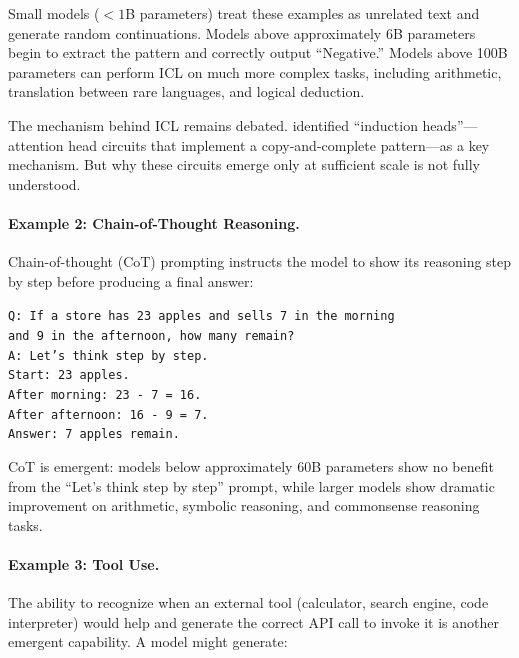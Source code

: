 Small models ($< 1$B parameters) treat these examples as unrelated text and generate random continuations. Models above approximately 6B parameters begin to extract the pattern and correctly output ``Negative.'' Models above 100B parameters can perform ICL on much more complex tasks, including arithmetic, translation between rare languages, and logical deduction.

The mechanism behind ICL remains debated. \citet{olsson2022context} identified ``induction heads''---attention head circuits that implement a copy-and-complete pattern---as a key mechanism. But why these circuits emerge only at sufficient scale is not fully understood.

\paragraph{Example 2: Chain-of-Thought Reasoning.}
Chain-of-thought (CoT) prompting \citep{wei2022chain} instructs the model to show its reasoning step by step before producing a final answer:

\begin{center}
\begin{minipage}{0.85\textwidth}
\texttt{Q: If a store has 23 apples and sells 7 in the morning}\\
\texttt{and 9 in the afternoon, how many remain?}\\
\texttt{A: Let's think step by step.}\\
\texttt{Start: 23 apples.}\\
\texttt{After morning: 23 - 7 = 16.}\\
\texttt{After afternoon: 16 - 9 = 7.}\\
\texttt{Answer: 7 apples remain.}
\end{minipage}
\end{center}

CoT is emergent: models below approximately 60B parameters show no benefit from the ``Let's think step by step'' prompt, while larger models show dramatic improvement on arithmetic, symbolic reasoning, and commonsense reasoning tasks.

\paragraph{Example 3: Tool Use.}
The ability to recognize when an external tool (calculator, search engine, code interpreter) would help and generate the correct API call to invoke it is another emergent capability. A model might generate:

